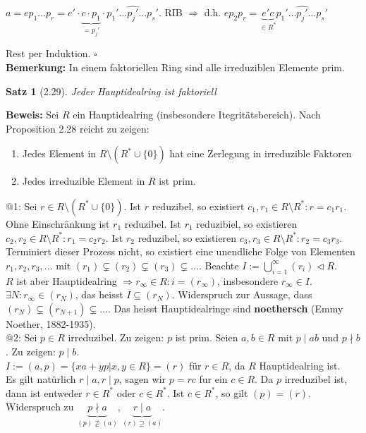 \documentclass[10pt,a4paper]{article}
\newtheorem{satz}{Satz}
\begin{document}
$a = e p_1 \dots p_r = e' \cdot \underbrace{c \cdot p_1}_{= p_j'} \cdot p_1' \dots \hat{p_j'} \dots p_s'$. RIB $\Rightarrow$ d.h. $e p_2 p_r = \underbrace{e' c}_{\in R^*} p_1' \dots \hat{p_j'} \dots p_s'$

Rest per Induktion. $\square$\\

\textbf{Bemerkung:} In einem faktoriellen Ring sind alle irreduziblen Elemente prim.\\

\begin{satz}[2.29]
 Jeder Hauptidealring ist faktoriell
\end{satz}
\textbf{Beweis:} Sei $R$ ein Hauptidealring (insbesondere Itegritätsbereich). Nach Proposition 2.28 reicht zu zeigen:
\begin{enumerate}
 \item Jedes Element in $R\setminus ( R^* \cup \lbrace 0 \rbrace )$ hat eine Zerlegung in irreduzible Faktoren
 \item Jedes irreduzible Element in $R$ ist prim.
\end{enumerate}
@1: Sei $r \in R \setminus ( R^* \cup \lbrace 0 \rbrace )$. Ist $r$ reduzibel, so existiert $c_1, r_1 \in R \setminus R^* : r = c_1 r_1$. Ohne Einschränkung ist $r_1$ reduzibel. Ist $r_1$ reduzibiel, so existieren $c_2, r_2 \in R \setminus R^* : r_1 = c_2 r_2$. Ist $r_2$ reduzibel, so existieren $c_3, r_3 \in R \setminus R^* : r_2 = c_3 r_3$. Terminiert dieser Prozess nicht, so existiert eine unendliche Folge von Elementen $r_1, r_2, r_3, ...$ mit $(r_1) \subsetneq (r_2) \subsetneq (r_3) \subsetneq \dots$. Beachte $I:=\bigcup_{i=1}^\infty (r_i) \triangleleft R$.\\
$R$ ist aber Hauptidealring $\Rightarrow r_\infty \in R : i = (r_\infty)$, insbesondere $r_\infty \in I$.\\
$\exists N : r_\infty \in (r_N)$, das heisst $I \subseteq (r_N)$. Widerspruch zur Aussage, dass $(r_N) \subsetneq (r_{N+1}) \subsetneq \dots$. Das heisst Hauptidealringe sind \textbf{noethersch} (Emmy Noether, 1882-1935).\\
@2: Sei $p\in R$ irreduzibel. Zu zeigen: $p$ ist prim. Seien $a,b \in R$ mit $p \mid ab$ und $p \nmid b$. Zu zeigen: $p \mid b$.\\
$I := (a,p) = \lbrace x a + y p | x,y \in R \rbrace = (r)$ für $r \in R$, da $R$ Hauptidealring ist.\\
Es gilt natürlich $r \mid a, r \mid p$, sagen wir $p = rc$ fur ein $c \in R$. Da $p$ irreduzibel ist, dann ist entweder $r\in R^*$ oder $c \in R^*$. Ist $c \in R^*$, so gilt $(p) = (r)$. Widerspruch zu $\underbrace{p\nmid a}_{(p) \nsupseteq (a)}, \underbrace{r \mid a}_{(r) \supseteq (a)}$.\\
\end{document}
